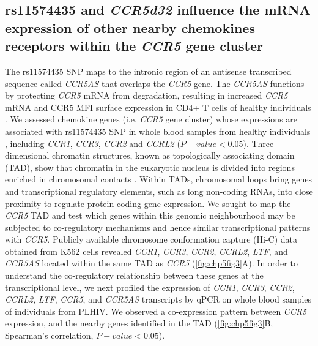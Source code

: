\documentclass{book}
\begin{document}
\begin{refsection}
\subsection*{rs11574435 and \textit{CCR5d32} influence the mRNA expression of other nearby chemokines receptors within the \textit{CCR5} gene cluster}
The rs11574435 SNP maps to the intronic region of an antisense transcribed sequence called \textit{CCR5AS} that overlaps the \textit{CCR5} gene.
The \textit{CCR5AS} functions by protecting \textit{CCR5} mRNA from degradation, resulting in increased \textit{CCR5} mRNA and CCR5 MFI surface expression in CD4+ T cells of healthy individuals \cite{Kulkarni2019CCR5AS}.
We assessed chemokine genes (i.e. \textit{CCR5} gene cluster) whose expressions are associated with rs11574435 SNP in whole blood samples from healthy individuals \cite{Võsa2021Large}, including \textit{CCR1}, \textit{CCR3}, \textit{CCR2} and \textit{CCRL2} ($P-value < 0.05$).
Three-dimensional chromatin structures, known as topologically associating domain (TAD), show that chromatin in the eukaryotic nucleus is divided into regions enriched in chromosomal contacts \cite{Fanucchi2019Lnc}.
Within TADs, chromosomal loops bring genes and transcriptional regulatory elements, such as long non-coding RNAs, into close proximity to regulate protein-coding gene expression.
We sought to map the \textit{CCR5} TAD and test which genes within this genomic neighbourhood may be subjected to co-regulatory mechanisms and hence similar transcriptional patterns with \textit{CCR5}.
Publicly available chromosome conformation capture (Hi-C) data obtained from K562 cells revealed \textit{CCR1}, \textit{CCR3}, \textit{CCR2}, \textit{CCRL2}, \textit{LTF}, and \textit{CCR5AS} located within the same TAD as \textit{CCR5} (\ref{fig:chp5fig3}A).
In order to understand the co-regulatory relationship between these genes at the transcriptional level, we next profiled the expression of \textit{CCR1}, \textit{CCR3}, \textit{CCR2}, \textit{CCRL2}, \textit{LTF}, \textit{CCR5}, and \textit{CCR5AS} transcripts by qPCR on whole blood samples of individuals from PLHIV.
We observed a co-expression pattern between \textit{CCR5} expression, and the nearby genes identified in the TAD (\ref{fig:chp5fig3}B, Spearman’s correlation, $P-value < 0.05$). 


\end{refsection}
\end{document}
